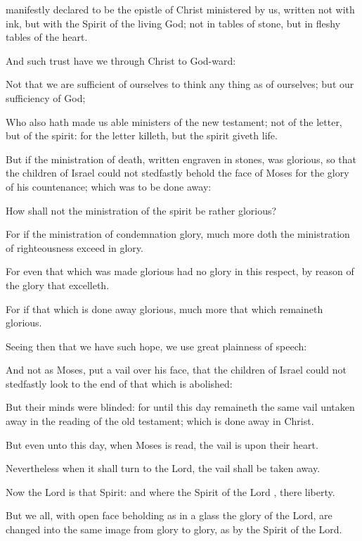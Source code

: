 {
manifestly
declared to
be the
epistle of
Christ
ministered
by
us,
written
not with
ink,
but with the
Spirit of the
living
God;
not
in
tables of
stone,
but
in
fleshy
tables of the
heart.


\par }{\PP {}And
such
trust have
we
through
Christ
to
God-ward:

Not
that we
are
sufficient
of
ourselves to
think any
thing
as
of
ourselves;
but
our
sufficiency
{}
of
God;

Who
also hath
made
us able
ministers of the
new
testament;
not of the
letter,
but of the
spirit:
for the
letter
killeth,
but the
spirit giveth
life.

But
if the
ministration of
death,
written
{}
engraven
in
stones,
was
glorious, so
that the
children of
Israel
could
not stedfastly
behold the
face of
Moses
for the
glory of
his
countenance;
which
{} was to be done
away:

How
shall
not the
ministration of the
spirit
be
rather
glorious?

For
if the
ministration of
condemnation
{}
glory,
much
more
doth the
ministration of
righteousness
exceed
in
glory.

For
even that
which was made
glorious
had
no
glory
in
this
respect, by reason
of the
glory
that
excelleth.

For
if that
which is done
away
{}
glorious,
much
more that
which
remaineth
{}
glorious.

Seeing
then that we
have
such
hope, we
use
great plainness of
speech:

And
not
as
Moses,
{}
put a
vail
over
his
face,
that the
children of
Israel
could
not stedfastly
look
to the
end of that
which is
abolished:

But
their
minds were
blinded:
for
until this
day
remaineth the
same
vail untaken
away
in the
reading of the
old
testament;
which
{} is done
away
in
Christ.

But even
unto this
day,
when
Moses is
read, the
vail
is
upon
their
heart.

Nevertheless
when it shall
turn
to the
Lord, the
vail shall be taken
away.

Now the
Lord
is that
Spirit:
and
where the
Spirit of the
Lord
{},
there
{}
liberty.

But
we
all,
with
open
face beholding as in a
glass the
glory of the
Lord, are
changed into the
same
image
from
glory
to
glory,
{}
as by the
Spirit
of the
Lord.




}
